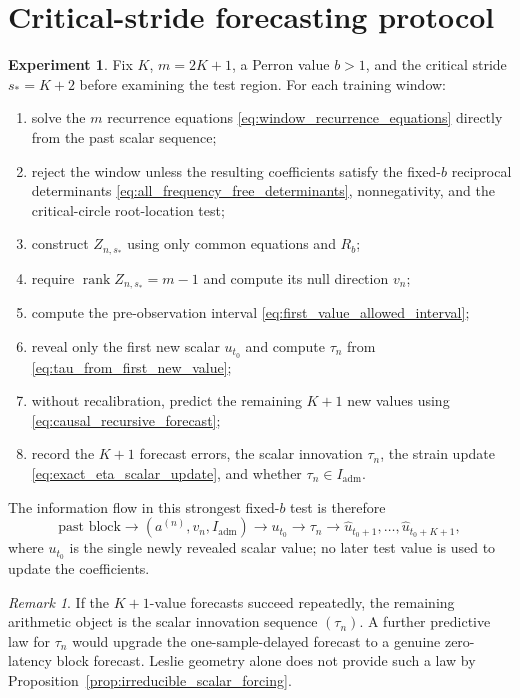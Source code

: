 \documentclass[11pt]{amsart}
\numberwithin{equation}{section}
\theoremstyle{plain}
\theoremstyle{definition}
\newtheorem{experiment}[theorem]{Experiment}
\theoremstyle{remark}
\newtheorem{remark}[theorem]{Remark}
\begin{document}
\section{Critical-stride forecasting protocol}
\label{sec:critical_stride_protocol}

\begin{experiment}
\label{exp:critical_stride_forecast}
Fix $K$, $m=2K+1$, a Perron value $b>1$, and the critical stride $s_*=K+2$ before examining the test region.  For each training window:
\begin{enumerate}
\item solve the $m$ recurrence equations \eqref{eq:window_recurrence_equations} directly from the past scalar sequence;
\item reject the window unless the resulting coefficients satisfy the fixed-$b$ reciprocal determinants \eqref{eq:all_frequency_free_determinants}, nonnegativity, and the critical-circle root-location test;
\item construct $Z_{n,s_*}$ using only common equations and $R_b$;
\item require $\operatorname{rank}Z_{n,s_*}=m-1$ and compute its null direction $v_n$;
\item compute the pre-observation interval \eqref{eq:first_value_allowed_interval};
\item reveal only the first new scalar $u_{t_0}$ and compute $\tau_n$ from \eqref{eq:tau_from_first_new_value};
\item without recalibration, predict the remaining $K+1$ new values using \eqref{eq:causal_recursive_forecast};
\item record the $K+1$ forecast errors, the scalar innovation $\tau_n$, the strain update \eqref{eq:exact_eta_scalar_update}, and whether $\tau_n\in I_{\mathrm{adm}}$.
\end{enumerate}
\end{experiment}

The information flow in this strongest fixed-$b$ test is therefore
\begin{equation}
\text{past block}
\longrightarrow
(a^{(n)},v_n,I_{\mathrm{adm}})
\longrightarrow
u_{t_0}
\longrightarrow
\tau_n
\longrightarrow
\widehat u_{t_0+1},\ldots,\widehat u_{t_0+K+1},
\label{eq:critical_stride_information_flow}
\end{equation}
where $u_{t_0}$ is the single newly revealed scalar value; no later test value is used to update the coefficients.

\begin{remark}
\label{rem:innovation_sequence_next_target}
If the $K+1$-value forecasts succeed repeatedly, the remaining arithmetic object is the scalar innovation sequence $(\tau_n)$.  A further predictive law for $\tau_n$ would upgrade the one-sample-delayed forecast to a genuine zero-latency block forecast.  Leslie geometry alone does not provide such a law by Proposition~\ref{prop:irreducible_scalar_forcing}.
\end{remark}
\end{document}
